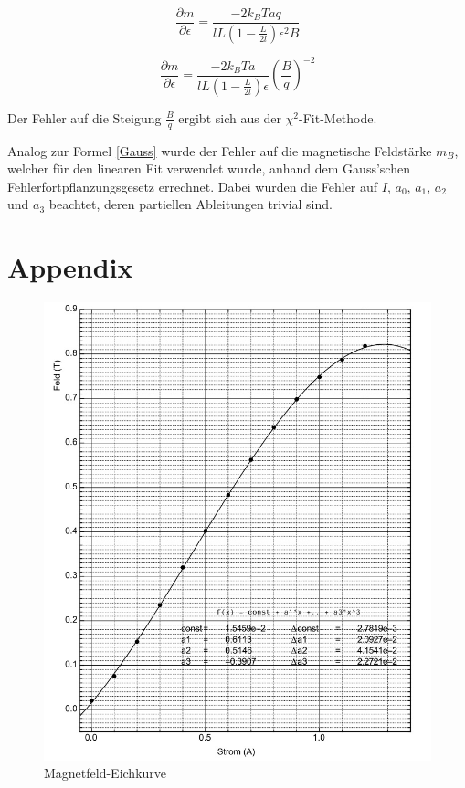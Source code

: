 \documentclass[a4paper,parskip,11pt, DIV12]{scrreprt}
\begin{document}
\begin{equation}
\frac{\partial m}{\partial \epsilon} = \frac{-2k_BTaq}{lL(1-\frac{L}{2l})\epsilon^2 B}
\end{equation}

\begin{equation} \label{letzteableitung}
\frac{\partial m}{\partial \epsilon} = \frac{-2k_BTa}{lL(1-\frac{L}{2l})\epsilon} \left(\frac{B}{q}\right)^{-2}
\end{equation}

Der Fehler auf die Steigung $\frac{B}{q}$ ergibt sich aus der $\chi^2$-Fit-Methode.

Analog zur Formel \ref{Gauss} wurde der Fehler auf die magnetische Feldstärke $m_B$, welcher für den linearen Fit verwendet wurde, anhand dem Gauss'schen Fehlerfortpflanzungsgesetz errechnet. Dabei wurden die Fehler auf $I$, $a_0$, $a_1$, $a_2$ und $a_3$ beachtet, deren partiellen Ableitungen trivial sind.

\clearpage

\chapter{Appendix}

\begin{figure}[H]
\centering
\includegraphics[scale=1]{Eichkurve}
\caption[Eichkurve]{Magnetfeld-Eichkurve}
\label{Abb:Eichkurve}
\end{figure}

 

\end{document}
